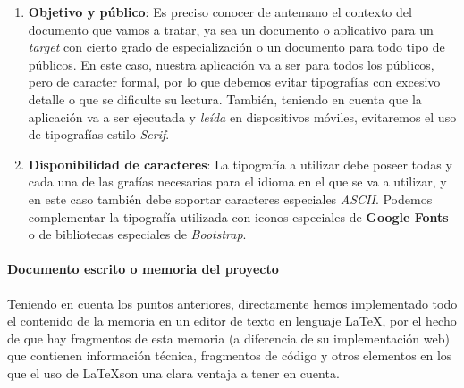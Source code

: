 \documentclass[../ei103948-project-documentation.tex]{subfiles}
\begin{document}
                                \begin{enumerate}
                                    \item \textbf{Objetivo y público}: Es preciso conocer de antemano el contexto del documento que vamos a tratar, ya sea un documento o aplicativo para un \textit{target} con cierto grado de especialización o un documento para todo tipo de públicos. En este caso, nuestra aplicación va a ser para todos los públicos, pero de caracter formal, por lo que debemos evitar tipografías con excesivo detalle o que se dificulte su lectura. También, teniendo en cuenta que la aplicación va a ser ejecutada y \textit{leída} en dispositivos móviles, evitaremos el uso de tipografías estilo \textit{Serif}.
                                    \item \textbf{Disponibilidad de caracteres}: La tipografía a utilizar debe poseer todas y cada una de las grafías necesarias para el idioma en el que se va a utilizar, y en este caso también debe soportar caracteres especiales \textit{ASCII}. Podemos complementar la tipografía utilizada con iconos especiales de \textbf{Google Fonts} o de bibliotecas especiales de \textit{Bootstrap}.
                                \end{enumerate}
                    
                            \paragraph*{Documento escrito o memoria del proyecto}
                            Teniendo en cuenta los puntos anteriores, directamente hemos implementado todo el contenido de la memoria en un editor de texto en lenguaje \LaTeX, por el hecho de que hay fragmentos de esta memoria (a diferencia de su implementación web) que contienen información técnica, fragmentos de código y otros elementos en los que el uso de \LaTeX son una clara ventaja a tener en cuenta.\\
                    
\end{document}
